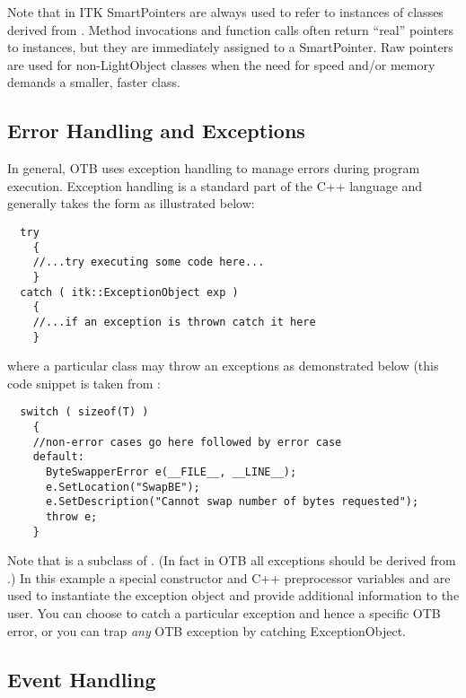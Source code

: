 Note that in ITK SmartPointers are always used to refer to instances of
classes derived from . Method invocations and function
calls often return ``real'' pointers to instances, but they are immediately
assigned to a SmartPointer. Raw pointers are used for non-LightObject classes when
the need for speed and/or memory demands a smaller, faster class.


\subsection{Error Handling and Exceptions}
\label{sec:ErrorHandling}


In general, OTB uses exception handling to manage errors during program
execution. Exception handling is a standard part of the C++ language and
generally takes the form as illustrated below:
\small
\begin{verbatim}
  try
    {
    //...try executing some code here...
    }
  catch ( itk::ExceptionObject exp )
    {
    //...if an exception is thrown catch it here
    }
\end{verbatim}
\normalsize

where a particular class may throw an exceptions as demonstrated below (this
code snippet is taken from :
\small
\begin{verbatim}
  switch ( sizeof(T) )
    {
    //non-error cases go here followed by error case  
    default:  
      ByteSwapperError e(__FILE__, __LINE__);
      e.SetLocation("SwapBE");
      e.SetDescription("Cannot swap number of bytes requested");
      throw e;
    }
\end{verbatim}
\normalsize

Note that  is a subclass of
. (In fact in OTB all exceptions should be derived
from .) In this example a special constructor and C++
preprocessor variables  and  are used to instantiate
the exception object and provide additional information to the user. You can
choose to catch a particular exception and hence a specific OTB error, or you
can trap \emph{any} OTB exception by catching ExceptionObject.


\subsection{Event Handling}
\label{sec:EventHandling}

